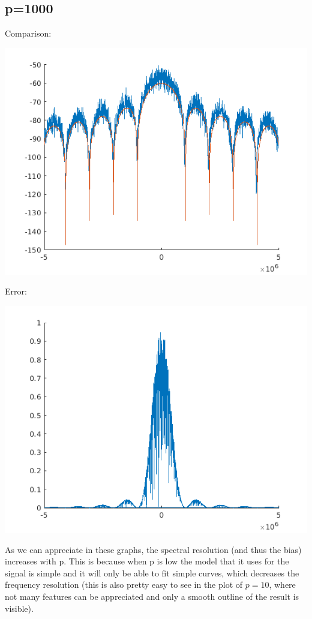 \documentclass[conference,9pt]{IEEEtran}
\begin{document}
\subsection{p=1000}
Comparison:

\includegraphics[scale=0.6]{arp1000.png}

Error:

\includegraphics[scale=0.6]{earp1000.png}

As we can appreciate in these graphs, the spectral resolution (and thus the bias) increases with p. This is because when p is low the model that it uses for the signal is simple and it will only be able to fit simple curves, which decreases the frequency resolution (this is also pretty easy to see in the plot of $p=10$, where not many features can be appreciated and only a smooth outline of the result is visible).
\end{document}

